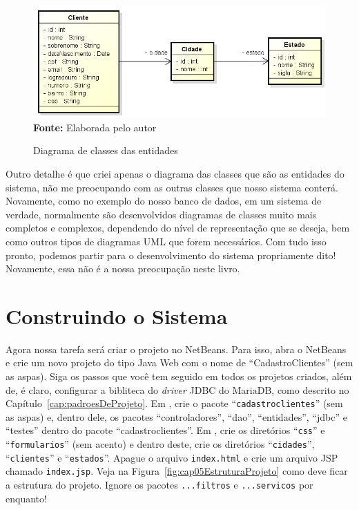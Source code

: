 \FloatBarrier
\begin{figure}[!htbp]
    \centering
    \caption{Diagrama de classes das entidades}
    \includegraphics[scale=0.6]{imagens/cap05DiagramaClasses}
    \\\textbf{Fonte:} Elaborada pelo autor
    \label{fig:cap05DiagramaClasses}
\end{figure}
\FloatBarrier

Outro detalhe é que criei apenas o diagrama das classes que são as entidades do sistema, não me preocupando com as outras classes que nosso sistema conterá. Novamente, como no exemplo do nosso banco de dados, em um sistema de verdade, normalmente são desenvolvidos diagramas de classes muito mais completos e complexos, dependendo do nível de representação que se deseja, bem como outros tipos de diagramas UML que forem necessários. Com tudo isso pronto, podemos partir para o desenvolvimento do sistema propriamente dito! Novamente, essa não é a nossa preocupação neste livro.


\section{Construindo o Sistema}

Agora nossa tarefa será criar o projeto no NetBeans. Para isso, abra o NetBeans e crie um novo projeto do tipo Java Web com o nome de ``CadastroClientes'' (sem as aspas). Siga os passos que você tem seguido em todos os projetos criados, além de, é claro, configurar a bibliteca do \textit{driver} JDBC do MariaDB, como descrito no Capítulo~\ref{cap:padroesDeProjeto}. Em , crie o pacote ``\texttt{cadastroclientes}'' (sem as aspas) e, dentro dele, os pacotes ``controladores'', ``dao'', ``entidades'', ``jdbc'' e ``testes'' dentro do pacote ``cadastroclientes''. Em , crie os diretórios ``\texttt{css}'' e ``\texttt{formularios}'' (sem acento) e dentro deste, crie os diretórios ``\texttt{cidades}'', ``\texttt{clientes}'' e ``\texttt{estados}''. Apague o arquivo \texttt{index.html} e crie um arquivo JSP chamado \texttt{index.jsp}. Veja na Figura~\ref{fig:cap05EstruturaProjeto} como deve ficar a estrutura do projeto. Ignore os pacotes \texttt{...filtros} e \texttt{...servicos} por enquanto!


